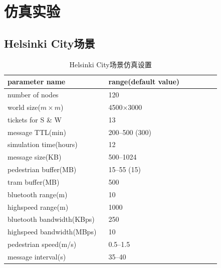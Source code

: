 \section{仿真实验}
\label{chap5:仿真实验}

\subsection{Helsinki City场景}

\begin{table}
\centering
\caption{Helsinki City场景仿真设置}
\label{tab:chap5_simulation_helsinki}
\begin{tabular}{
p{0.45\linewidth}<{\centering}
p{0.5\linewidth}<{\centering}
}
\hline
\textbf{parameter name} & \textbf{range(default value)} \\
\hline
number of nodes & 120  \\
world size($m\times m$) & 4500$\times$3000  \\
tickets for S \& W & 13 \\
message TTL(min) & 200--500 (300) \\
simulation time(hours) & 12 \\
message size(KB) & 500--1024 \\
pedestrian buffer(MB) & 15--55 (15) \\
tram buffer(MB) & 500 \\
bluetooth range(m) & 10 \\
highspeed range(m) & 1000 \\ 
bluetooth bandwidth(KBps) & 250 \\
highspeed bandwidth(MBps) & 10 \\ 
pedestrian speed(m/s) & 0.5--1.5  \\
message interval(s) & 35--40 \\
\hline
\end{tabular}
\end{table}

